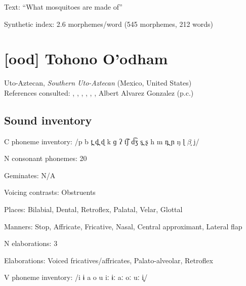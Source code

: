 {\begin{appendixdesc}
\item[Text:] “What mosquitoes are made of” \citep[133--143]{Stonham1999}

\item[Synthetic index:] 2.6 morphemes/word (545 morphemes, 212 words)
\end{appendixdesc}
\section*{[ood] Tohono O’odham}   %
Uto-Aztecan, \textit{Southern Uto-Aztecan} (Mexico, United States)\medskip\\
References consulted: \citet{DoloresMathiot1991}, \citet{Fitzgerald1994}, \citet{Hale1959}, \citet{HillZepeda1992}, \citet{Saxton1963}, \citet{Saxton1982}, Albert Alvarez Gonzalez (p.c.)

\subsection*{Sound inventory}
\begin{appendixdesc}

\item[C phoneme inventory:] /p b t̪ d̪ ɖ k ɡ ʔ t͡ʃ d͡ʒ s̪ ʂ h m n̪ ɲ ŋ ɭ $\beta ̞$ j/

\item[N consonant phonemes:] 20

\item[Geminates:] N/A

\item[Voicing contrasts:] Obstruents

\item[Places:] Bilabial, Dental, Retroflex, Palatal, Velar, Glottal

\item[Manners:] Stop, Affricate, Fricative, Nasal, Central approximant, Lateral flap

\item[N elaborations:] 3

\item[Elaborations:] Voiced fricatives/affricates, Palato-alveolar, Retroflex

\item[V phoneme inventory:] /i ɨ a o u iː ɨː aː oː uː i̥/


\end{appendixdesc}}
